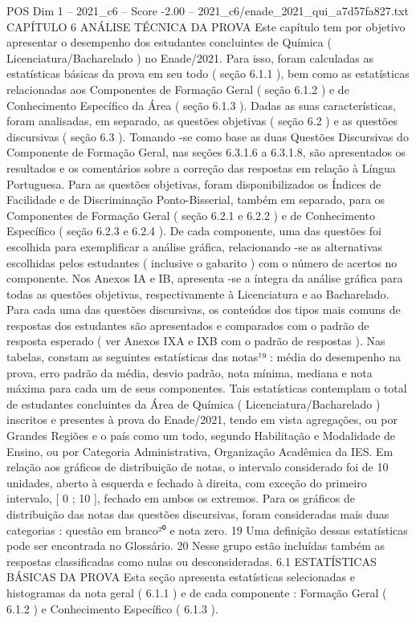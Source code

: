 \begin{textsample}{POS Dim 1 – 2021\_c6 – Score -2.00 – 2021\_c6/enade\_2021\_qui\_a7d57fa827.txt}  \label{ex:f1_pos_205}
CAPÍTULO 6 ANÁLISE TÉCNICA DA PROVA Este capítulo tem por objetivo apresentar o desempenho dos estudantes concluintes de Química ( Licenciatura/Bacharelado ) no Enade/2021.
Para isso, foram calculadas as estatísticas básicas da prova em seu todo ( seção 6.1.1 ), bem como as estatísticas relacionadas aos Componentes de Formação Geral ( seção 6.1.2 ) e de Conhecimento Específico da Área ( seção 6.1.3 ).
Dadas as suas características, foram analisadas, em separado, as questões objetivas ( seção 6.2 ) e as questões discursivas ( seção 6.3 ).
Tomando -se como base as duas Questões Discursivas do Componente de Formação Geral, nas seções 6.3.1.6 a 6.3.1.8, são apresentados os resultados e os comentários sobre a correção das respostas em relação à Língua Portuguesa.
Para as questões objetivas, foram disponibilizados os Índices de Facilidade e de Discriminação Ponto-Bisserial, também em separado, para os Componentes de Formação Geral ( seção 6.2.1 e 6.2.2 ) e de Conhecimento Específico ( seção 6.2.3 e 6.2.4 ).
De cada componente, uma das questões foi escolhida para exemplificar a análise gráfica, relacionando -se as alternativas escolhidas pelos estudantes ( inclusive o gabarito ) com o número de acertos no componente.
Nos Anexos IA e IB, apresenta -se a íntegra da análise gráfica para todas as questões objetivas, respectivamente à Licenciatura e ao Bacharelado.
Para cada uma das questões discursivas, os conteúdos dos tipos mais comuns de respostas dos estudantes são apresentados e comparados com o padrão de resposta esperado ( ver Anexos IXA e IXB com o padrão de respostas ).
Nas tabelas, constam as seguintes estatísticas das notas¹⁹ : média do desempenho na prova, erro padrão da média, desvio padrão, nota mínima, mediana e nota máxima para cada um de seus componentes.
Tais estatísticas contemplam o total de estudantes concluintes da Área de Química ( Licenciatura/Bacharelado ) inscritos e presentes à prova do Enade/2021, tendo em vista agregações, ou por Grandes Regiões e o país como um todo, segundo Habilitação e Modalidade de Ensino, ou por Categoria Administrativa, Organização Acadêmica da IES.
Em relação aos gráficos de distribuição de notas, o intervalo considerado foi de 10 unidades, aberto à esquerda e fechado à direita, com exceção do primeiro intervalo, [ 0 ; 10 ], fechado em ambos os extremos.
Para os gráficos de distribuição das notas das questões discursivas, foram consideradas mais duas categorias : questão em branco²⁰ e nota zero. 19 Uma definição dessas estatísticas pode ser encontrada no Glossário. 20 Nesse grupo estão incluídas também as respostas classificadas como nulas ou desconsideradas. 6.1 ESTATÍSTICAS BÁSICAS DA PROVA Esta seção apresenta estatísticas selecionadas e histogramas da nota geral ( 6.1.1 ) e de cada componente : Formação Geral ( 6.1.2 ) e Conhecimento Específico ( 6.1.3 ).

\end{textsample}
